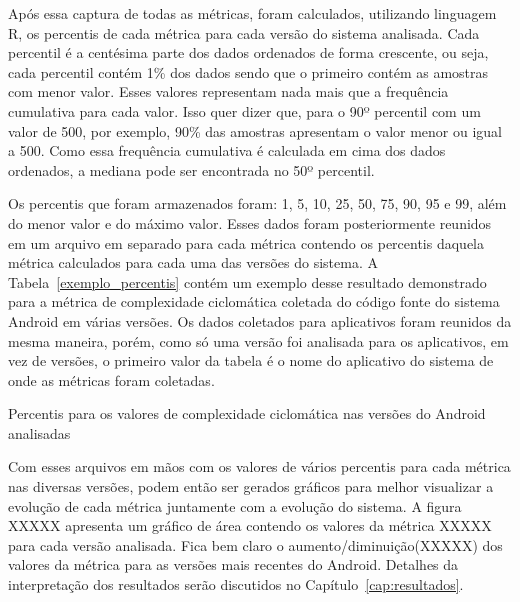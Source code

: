 Após essa captura de todas as métricas, foram calculados, utilizando linguagem R, os percentis de cada métrica para cada versão do sistema analisada. Cada percentil é a centésima parte dos dados ordenados de forma crescente, ou seja, cada percentil contém 1\% dos dados sendo que o primeiro contém as amostras com menor valor. Esses valores representam nada mais que a frequência cumulativa para cada valor. Isso quer dizer que, para o 90º percentil com um valor de 500, por exemplo, 90\% das amostras apresentam o valor menor ou igual a 500. Como essa frequência cumulativa é calculada em cima dos dados ordenados, a mediana pode ser encontrada no 50º percentil.

Os percentis que foram armazenados foram: 1, 5, 10, 25, 50, 75, 90, 95 e 99, além do menor valor e do máximo valor. Esses dados foram posteriormente reunidos em um arquivo em separado para cada métrica contendo os percentis daquela métrica calculados para cada uma das versões do sistema. A Tabela~\ref{exemplo_percentis} contém um exemplo desse resultado demonstrado para a métrica de complexidade ciclomática coletada do código fonte do sistema Android em várias versões. Os dados coletados para aplicativos foram reunidos da mesma maneira, porém, como só uma versão foi analisada para os aplicativos, em vez de versões, o primeiro valor da tabela é o nome do aplicativo do sistema de onde as métricas foram coletadas.

\begin{table}[!htb]

\caption{Percentis para os valores de complexidade ciclomática nas versões do Android analisadas}
\label{exemplo_percentis}
\end{table} 

Com esses arquivos em mãos com os valores de vários percentis para cada métrica nas diversas versões, podem então ser gerados gráficos para melhor visualizar a evolução de cada métrica juntamente com a evolução do sistema. A figura XXXXX apresenta um gráfico de área contendo os valores da métrica XXXXX para cada versão analisada. Fica bem claro o aumento/diminuição(XXXXX) dos valores da métrica para as versões mais recentes do Android. Detalhes da interpretação dos resultados serão discutidos no Capítulo~\ref{cap:resultados}.

